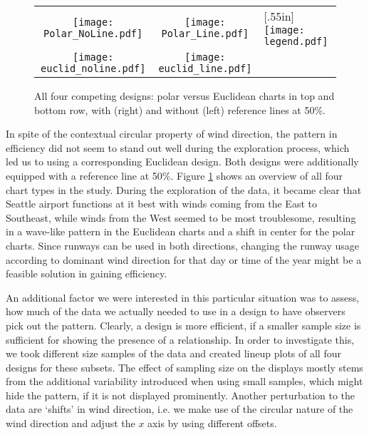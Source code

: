 \begin{figure}[htbp] %
 \hspace{-.1in}
   \begin{tabular}{ccl}
   \texttt{[image: Polar\_NoLine.pdf]} &  \hspace{-.3in}
   \texttt{[image: Polar\_Line.pdf]}  &  \hspace{-.2in} \multirow{2}{*}[.55in]{  \texttt{[image: legend.pdf]}} \\
   \texttt{[image: euclid\_noline.pdf]} & \hspace{-.3in}
   \texttt{[image: euclid\_line.pdf]}
   \end{tabular}
   \caption{All four competing designs: polar versus Euclidean charts in top and bottom row, with (right) and without (left) reference lines at 50\%. }
   \label{layouts}
\end{figure}

In spite of the contextual circular property of wind direction, the pattern in efficiency did not seem to stand out well during the exploration process, which led us to using a corresponding  Euclidean design. Both designs were additionally equipped with a reference line at 50\%. 
Figure \ref{layouts} shows an overview of all four chart types in the study. During the exploration of the data, it became clear that Seattle airport functions at it best with winds coming from the East to Southeast, while winds from the West seemed to be most troublesome, resulting in a wave-like pattern in the Euclidean charts and a shift in center for the polar charts. Since runways can be used in both directions, changing the runway usage according to dominant wind direction for that day or time of the year might be a feasible solution in gaining efficiency. 

An additional factor we were interested in this particular situation was to assess, how much of the data we actually needed to use in a design to have observers pick out the pattern. Clearly, a design is more efficient, if a smaller sample size is sufficient for showing the presence of a relationship. In order to investigate this, we took different size samples of the data and created lineup plots of all four designs for these subsets. The effect of sampling size on the displays mostly stems from the additional variability introduced when using small samples, which might hide the pattern, if it is not displayed prominently. 
Another perturbation to the data are `shifts' in wind direction, i.e. we make use of the circular nature of the wind direction and adjust the $x$ axis by using different offsets.

